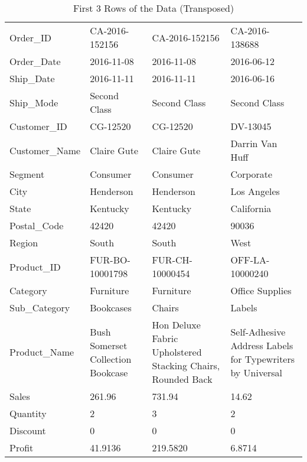 \documentclass[border=1mm]{standalone}
\begin{document}
\begin{longtable}[t]{llll}
\caption{\label{tab:data_table1}First 3 Rows of the Data (Transposed)}\\
\toprule
 &  &  & \\
\midrule
Order\_ID & CA-2016-152156 & CA-2016-152156 & CA-2016-138688\\
Order\_Date & 2016-11-08 & 2016-11-08 & 2016-06-12\\
Ship\_Date & 2016-11-11 & 2016-11-11 & 2016-06-16\\
Ship\_Mode & Second Class & Second Class & Second Class\\
Customer\_ID & CG-12520 & CG-12520 & DV-13045\\
\addlinespace
Customer\_Name & Claire Gute & Claire Gute & Darrin Van Huff\\
Segment & Consumer & Consumer & Corporate\\
City & Henderson & Henderson & Los Angeles\\
State & Kentucky & Kentucky & California\\
Postal\_Code & 42420 & 42420 & 90036\\
\addlinespace
Region & South & South & West\\
Product\_ID & FUR-BO-10001798 & FUR-CH-10000454 & OFF-LA-10000240\\
Category & Furniture & Furniture & Office Supplies\\
Sub\_Category & Bookcases & Chairs & Labels\\
Product\_Name & Bush Somerset Collection Bookcase & Hon Deluxe Fabric Upholstered Stacking Chairs, Rounded Back & Self-Adhesive Address Labels for Typewriters by Universal\\
\addlinespace
Sales & 261.96 & 731.94 & 14.62\\
Quantity & 2 & 3 & 2\\
Discount & 0 & 0 & 0\\
Profit & 41.9136 & 219.5820 & 6.8714\\
\bottomrule
\end{longtable}
\end{document}
